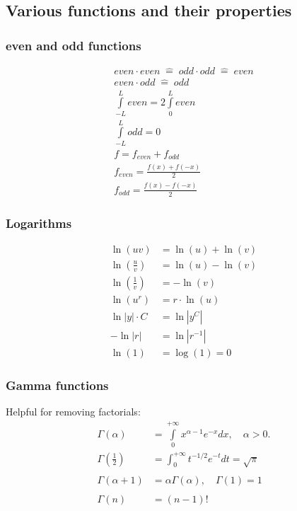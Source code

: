 \subsection{Various functions and their properties}
\subsubsection{even and odd functions}
\begin{gather*}
    even \cdot even\;\widehat{=}\; odd \cdot odd \;\widehat{=}\; even \\
    even \cdot odd \;\widehat{=}\; odd \\
    \int\limits_{-L}^L even=2\int\limits_0^L even \\
    \int\limits_{-L}^L odd = 0 \\
    f=f_{even}+f_{odd} \\
    f_{even}=\frac{f(x)+f(-x)}{2} \\
    f_{odd}=\frac{f(x)-f(-x)}{2}
\end{gather*}

\subsubsection{Logarithms}
\begin{align*}
    \ln(uv)                     & =\ln(u)+\ln(v) \\
    \ln\left(\frac{u}{v}\right) & =\ln(u)-\ln(v) \\
    \ln\left(\frac{1}{v}\right) & =-\ln(v)       \\
    \ln(u^r)                    & =r\cdot \ln(u) \\
    \ln |y|\cdot C              & = \ln |y^C|    \\
    - \ln |r|                   & = \ln|r^{-1}|  \\
    \ln(1)                      & = \log(1) = 0
\end{align*}


\subsubsection{Gamma functions}
Helpful for removing factorials:
\begin{align*}
    \Gamma(\alpha)             & =\int\limits_{0}^{+\infty}x^{\alpha-1}e^{-x}dx,\quad\alpha>0. \\
    \Gamma\left(\frac12\right) & =\int_0^{+\infty}t^{-1/2}e^{-t}dt=\sqrt{\pi}                  \\ \\
    \Gamma(\alpha+1)           & =\alpha\Gamma(\alpha),\quad \Gamma(1)=1                       \\ \\
    \Gamma(n)                  & =(n-1)!
\end{align*}

